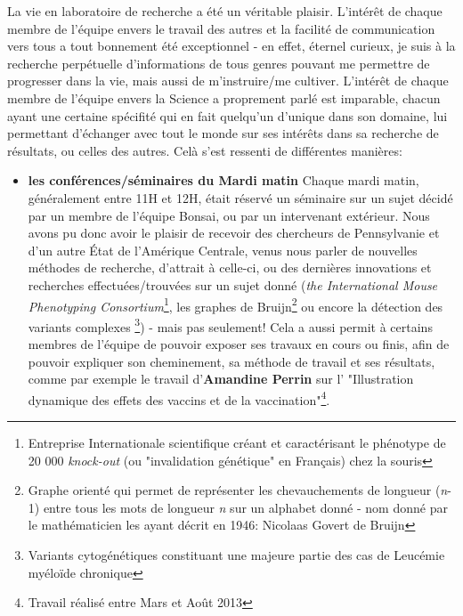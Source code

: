 \documentclass[12pt]{report}
\begin{document}
\begin{spacing}{1.2}
La vie en laboratoire de recherche a été un véritable plaisir.
\newline
L'intérêt de chaque membre de l'équipe envers le travail des autres et la facilité de communication vers tous a tout bonnement été exceptionnel - en effet, éternel curieux, je suis à la recherche perpétuelle d'informations de tous genres pouvant me permettre de progresser dans la vie, mais aussi de m'instruire/me cultiver. L'intérêt de chaque membre de l'équipe envers la Science a proprement parlé est imparable, chacun ayant une certaine spécifité qui en fait quelqu'un d'unique dans son domaine, lui permettant d'échanger avec tout le monde sur ses intérêts dans sa recherche de résultats, ou celles des autres.
\newline
Celà s'est ressenti de différentes manières:
\begin{itemize}
\item \textbf{les conférences/séminaires du Mardi matin}
	\newline
	Chaque mardi matin, généralement entre 11H et 12H, était réservé un séminaire sur un sujet décidé par un membre de l'équipe Bonsai, ou par un intervenant extérieur.
	\newline
	Nous avons pu donc avoir le plaisir de recevoir des chercheurs de Pennsylvanie et d'un autre État de l'Amérique Centrale, venus nous parler de nouvelles méthodes de recherche, d'attrait à celle-ci, ou des dernières innovations et recherches effectuées/trouvées sur un sujet donné (\textit{the International Mouse Phenotyping Consortium}\footnote{Entreprise Internationale scientifique créant et caractérisant le phénotype de 20 000 \textit{knock-out} (ou "invalidation génétique" en Français) chez la souris}, les graphes de Bruijn\footnote{Graphe orienté qui permet de représenter les chevauchements de longueur (\textit{n}-1) entre tous les mots de longueur \textit{n} sur un alphabet donné - nom donné par le mathématicien les ayant décrit en 1946: Nicolaas Govert de Bruijn} ou encore la détection des variants complexes \footnote{Variants cytogénétiques constituant une majeure partie des cas de Leucémie myéloïde chronique}) -  mais pas seulement!
	\newline
	Cela a aussi permit à certains membres de l'équipe de pouvoir exposer ses travaux en cours ou finis, afin de pouvoir expliquer son cheminement, sa méthode de travail et ses résultats, comme par exemple le travail d'\textbf{Amandine Perrin} sur l' "Illustration dynamique des effets des vaccins et de la vaccination"\footnote{Travail réalisé entre Mars et Août 2013}.

\end{itemize}
\end{spacing}
\end{document}
